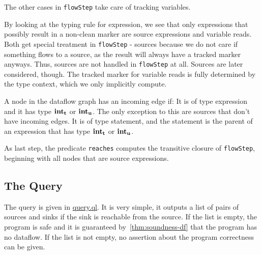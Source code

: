 The other cases in \texttt{flowStep} take care of tracking variables.


By looking at the typing rule for expression, we see that only expressions that possibly 
result in a non-clean marker are source expressions and variable reads.
Both get special treatment in \texttt{flowStep} - sources because we do not care
if something flows to a source,
as the result will always have a tracked marker anyways.
Thus, sources are not handled in \texttt{flowStep} at all.
Sources are later considered, though.
The tracked marker for variable reads is fully determined by the type context,
which we only implicitly compute.



A node in the dataflow graph has an incoming edge if:
It is of type expression and it has type $\textbf{int}_\textbf{t}$ or $\textbf{int}_\textbf{u}$.
The only exception to this are sources that don't have incoming edges.
It is of type statement, and the statement is the parent of an expression that has type
$\textbf{int}_\textbf{t}$ or $\textbf{int}_\textbf{u}$.



As last step, the predicate \texttt{reaches}
computes the transitive closure of \texttt{flowStep}, beginning with all nodes
that are source expressions.

\subsection{The Query}
The query is given in \hyperref[lst:query]{query.ql}.
It is very simple, it outputs a list of pairs of sources and sinks if the
sink is reachable from the source.
If the list is empty, the program is safe and it is guaranteed by~\autoref{thm:soundness-df}
that the program has no dataflow.
If the list is not empty, no assertion about the program correctness can be given.
